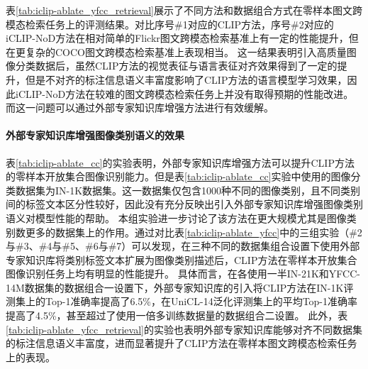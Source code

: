 表\ref{tab:iclip-ablate_yfcc_retrieval}展示了不同方法和数据组合方式在零样本图文跨模态检索任务上的评测结果。对比序号\#1对应的CLIP方法，序号\#2对应的iCLIP-NoD方法在相对简单的Flickr图文跨模态检索基准上有一定的性能提升，但在更复杂的COCO图文跨模态检索基准上表现相当。
这一结果表明引入高质量图像分类数据后，虽然CLIP方法的视觉表征与语言表征对齐效果得到了一定的提升，但是不对齐的标注信息语义丰富度影响了CLIP方法的语言模型学习效果，因此iCLIP-NoD方法在较难的图文跨模态检索任务上并没有取得预期的性能改进。而这一问题可以通过外部专家知识库增强方法进行有效缓解。

\paragraph{外部专家知识库增强图像类别语义的效果} 
表\ref{tab:iclip-ablate_cc}的实验表明，外部专家知识库增强方法可以提升CLIP方法的零样本开放集合图像识别能力。但是表\ref{tab:iclip-ablate_cc}实验中使用的图像分类数据集为IN-1K数据集。这一数据集仅包含1000种不同的图像类别，且不同类别间的标签文本区分性较好，因此没有充分反映出引入外部专家知识库增强图像类别语义对模型性能的帮助。
本组实验进一步讨论了该方法在更大规模尤其是图像类别数更多的数据集上的作用。通过对比表\ref{tab:iclip-ablate_yfcc}中的三组实验（\#2与\#3、\#4与\#5、\#6与\#7）可以发现，在三种不同的数据集组合设置下使用外部专家知识库将类别标签文本扩展为图像类别描述后，CLIP方法在零样本开放集合图像识别任务上均有明显的性能提升。
具体而言，在各使用一半IN-21K和YFCC-14M数据集的数据组合一设置下，外部专家知识库的引入将CLIP方法在IN-1K评测集上的Top-1准确率提高了6.5\%，在UniCL-14泛化评测集上的平均Top-1准确率提高了4.5\%，甚至超过了使用一倍多训练数据量的数据组合二设置。
此外，表\ref{tab:iclip-ablate_yfcc_retrieval}的实验也表明外部专家知识库能够对齐不同数据集的标注信息语义丰富度，进而显著提升了CLIP方法在零样本图文跨模态检索任务上的表现。%

